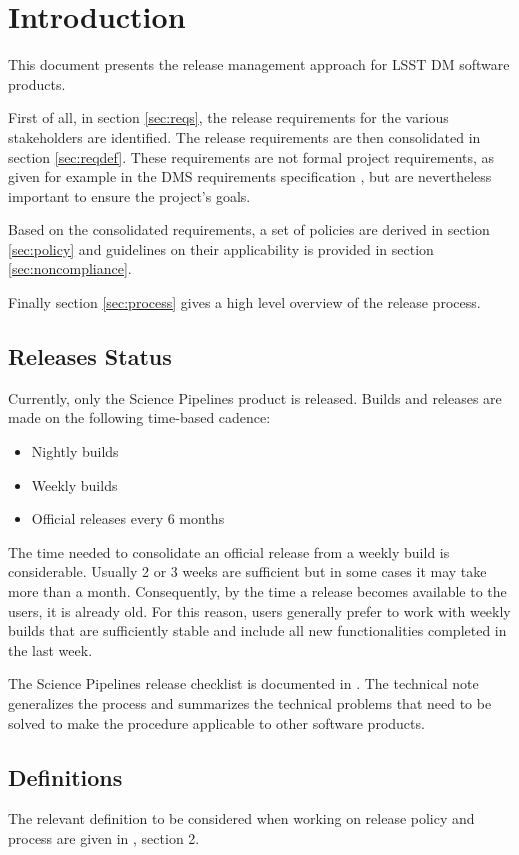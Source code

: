 \section{Introduction} \label{sec:intro}

This document presents the release management approach for \gls{LSST} \gls{DM} software products.

First of all, in section \ref{sec:reqs}, the release requirements for the various  stakeholders are identified.
The release requirements are then consolidated in section \ref{sec:reqdef}.
These requirements are not formal project requirements, as given for example in the \gls{DMS} requirements specification , but are nevertheless important to ensure the project's goals.

Based on the consolidated requirements, a set of policies are derived in section \ref{sec:policy} and guidelines on their applicability is provided in section \ref{sec:noncompliance}.

Finally section \ref{sec:process} gives a high level overview of the release process.


\subsection{Releases Status}\label{sec:sci}

Currently, only the \gls{Science Pipelines} product is released.
Builds and releases are made on the following time-based cadence:

\begin{itemize}
\item Nightly builds
\item Weekly builds
\item Official releases every 6 months
\end{itemize}

The time needed to consolidate an official release from a weekly build is considerable.
Usually 2 or 3 weeks are sufficient but in some cases it may take more than a month.
Consequently, by the time a release becomes available to the users, it is already old.
For this reason, users generally prefer to work with weekly builds that are sufficiently stable and include all new functionalities completed in the last week.

The \gls{Science Pipelines} release checklist is documented in .
The technical note  generalizes the process and summarizes the technical problems that need to be solved to make the  procedure applicable to other software products.


\subsection{Definitions} \label{sec:defs}

The relevant definition to be considered when working on release policy and process are given in , section 2.
